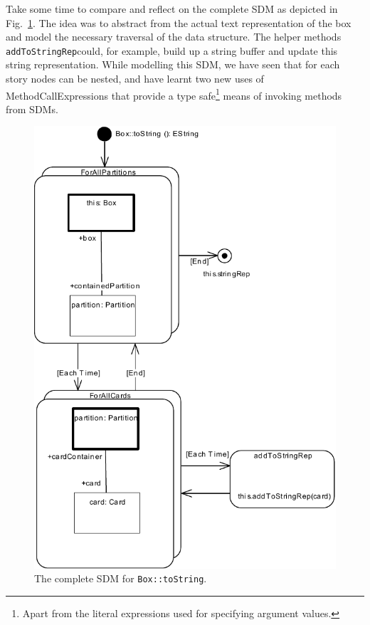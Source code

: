 
Take some time to compare and reflect on the complete SDM as depicted in
Fig.~\ref{fig:sdm_tostring_5}.  The idea was to abstract from the actual text
representation of the box and model the necessary traversal of the data
structure.  The helper methods \texttt{addToStringRep}could, for example, build up a string buffer and update
this string representation.  While modelling this SDM, we have
seen that for each story nodes can be nested, and have learnt two new uses of
MethodCallExpressions that provide a type safe\footnote{Apart from the literal
expressions used for specifying argument values.} means of invoking methods from
SDMs.

\begin{figure}[htbp]
\begin{center}
  \includegraphics[width=\textwidth]{pics/sdmBilder/toString/sdm76.pdf}
  \caption{The complete SDM for \texttt{Box::toString}.}  
  \label{fig:sdm_tostring_5}
\end{center}
\end{figure}
\FloatBarrier